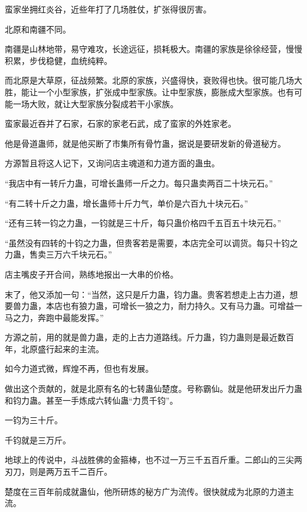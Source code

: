 
\begin{this_body}



蛮家坐拥红炎谷，近些年打了几场胜仗，扩张得很厉害。

北原和南疆不同。

南疆是山林地带，易守难攻，长途远征，损耗极大。南疆的家族是徐徐经营，慢慢积累，步伐稳健，血统纯粹。

而北原是大草原，征战频繁。北原的家族，兴盛得快，衰败得也快。很可能几场大胜，能让一个小型家族，扩张成中型家族。让中型家族，膨胀成大型家族。也有可能一场大败，就让大型家族分裂成若干小家族。

蛮家最近吞并了石家，石家的家老石武，成了蛮家的外姓家老。

他是骨道蛊师，就是他买断了市集所有骨竹蛊，据说是要研发新的骨道秘方。

方源暂且将这人记下，又询问店主魂道和力道方面的蛊虫。

“我店中有一转斤力蛊，可增长蛊师一斤之力。每只蛊卖两百二十块元石。”

“有二转十斤之力蛊，增长蛊师十斤力气，单价是六百九十块元石。”

“还有三转一钧之力蛊，一钧就是三十斤，每只蛊价格四千五百五十块元石。”

“虽然没有四转的十钧之力蛊，但贵客若是需要，本店完全可以调货。每只十钧之力蛊，售卖三万六千块元石。”

店主嘴皮子开合间，熟练地报出一大串的价格。

末了，他又添加一句：“当然，这只是斤力蛊，钧力蛊。贵客若想走上古力道，想要兽力蛊，本店也有狼力蛊，可增长一狼之力，耐力持久。又有马力蛊。可增益一马之力，奔跑中最能发挥。”

方源之前，用的就是兽力蛊，走的上古力道路线。斤力蛊，钧力蛊则是最近数百年，北原盛行起来的主流。

如今力道式微，辉煌不再，但也有发展。

做出这个贡献的，就是北原有名的七转蛊仙楚度。号称霸仙。就是他研发出斤力蛊和钧力蛊。甚至一手炼成六转仙蛊“力贯千钧”。

一钧为三十斤。

千钧就是三万斤。

地球上的传说中，斗战胜佛的金箍棒，也不过一万三千五百斤重。二郎山的三尖两刃刀，则是两万五千二百斤。

楚度在三百年前成就蛊仙，他所研炼的秘方广为流传。很快就成为北原的力道主流。


\end{this_body}
